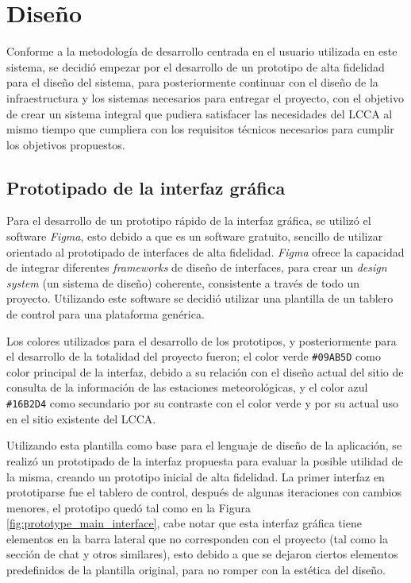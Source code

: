\section{Diseño}

Conforme a la metodología de desarrollo centrada en el usuario utilizada en este sistema, se decidió empezar por el desarrollo de un prototipo de alta fidelidad para el diseño del sistema, para posteriormente continuar con el diseño de la infraestructura y los sistemas necesarios para entregar el proyecto, con el objetivo de crear un sistema integral que pudiera satisfacer las necesidades del LCCA al mismo tiempo que cumpliera con los requisitos técnicos necesarios para cumplir los objetivos propuestos.

\subsection{Prototipado de la interfaz gráfica}

Para el desarrollo de un prototipo rápido de la interfaz gráfica, se utilizó el software \textit{Figma}, esto debido a que es un software gratuito, sencillo de utilizar orientado al prototipado de interfaces de alta fidelidad. \textit{Figma} ofrece la capacidad de integrar diferentes \textit{frameworks} de diseño de interfaces, para crear un \textit{design system} (un sistema de diseño) coherente, consistente a través de todo un proyecto. Utilizando este software se decidió utilizar una plantilla de un tablero de control para una plataforma genérica.

Los colores utilizados para el desarrollo de los prototipos, y posteriormente para el desarrollo de la totalidad del proyecto fueron; el color verde \texttt{\#09AB5D} como color principal de la interfaz, debido a su relación con el diseño actual del sitio de consulta de la información de las estaciones meteorológicas, y el color azul \texttt{\#16B2D4} como secundario por su contraste con el color verde y por su actual uso en el sitio existente del LCCA.

Utilizando esta plantilla como base para el lenguaje de diseño de la aplicación, se realizó un prototipado de la interfaz propuesta para evaluar la posible utilidad de la misma, creando un prototipo inicial de alta fidelidad. La primer interfaz en prototiparse fue el tablero de control, después de algunas iteraciones con cambios menores, el prototipo quedó tal como en la Figura \ref{fig:prototype_main_interface}, cabe notar que esta interfaz gráfica tiene elementos en la barra lateral que no corresponden con el proyecto (tal como la sección de chat y otros similares), esto debido a que se dejaron ciertos elementos predefinidos de la plantilla original, para no romper con la estética del diseño.

